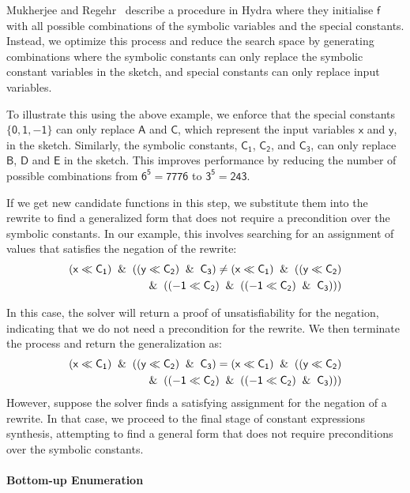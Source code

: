 \documentclass[review, anonymous, acmsmall]{acmart}
\newcommand{\inline}[1]{$\mathsf{#1}$}
\begin{document}
Mukherjee and Regehr~\cite{mukherjee_hydra_2024} describe a procedure in Hydra where they initialise \inline{f} with all possible combinations of the symbolic variables and the special constants. Instead, we optimize this process and reduce the search space by generating combinations where the symbolic constants can only replace the symbolic constant variables in the sketch, and special constants can only replace input variables. 

To illustrate this using the above example, we enforce that the special constants \inline{\{0, 1, -1\}} can only replace \inline{A} and \inline{C}, which represent the input variables \inline{x} and \inline{y}, in the sketch. Similarly, the symbolic constants, \inline{C_1}, \inline{C_2}, and \inline{C_3}, can only replace \inline{B}, \inline{D} and \inline{E} in the sketch. This improves performance by reducing the number of possible combinations from \inline{6^5 = 7776} to \inline{3^5 = 243}. 

If we get new candidate functions in this step, we substitute them into the rewrite to find a generalized form that does not require a precondition over the symbolic constants. In our example, this involves searching for an assignment of values that satisfies the negation of the rewrite:
\begin{align*}
\mathsf{
(x \ll C_1) \And ((y \ll C_2) \And C_3) \neq (x \ll C_1)  \And ((y \ll C_2)} \\ 
\mathsf{\And ((-1 \ll C_2) \And ((-1 \ll C_2) \And C_3)))}
\end{align*}

In this case, the solver will return a proof of unsatisfiability for the negation, indicating that we do not need a precondition for the rewrite. We then terminate the process and return the generalization as:
\begin{align*}
\mathsf{
(x \ll C_1) \And ((y \ll C_2) \And C_3) = (x \ll C_1)  \And ((y \ll C_2)} \\ 
\mathsf{\And ((-1 \ll C_2) \And ((-1 \ll C_2) \And C_3)))}
\end{align*}
However, suppose the solver finds a satisfying assignment for the negation of a rewrite. In that case, we proceed to the final stage of constant expressions synthesis, attempting to find a general form that does not require preconditions over the symbolic constants.

\paragraph{Bottom-up Enumeration}
\label{enumerative}
\end{document}
